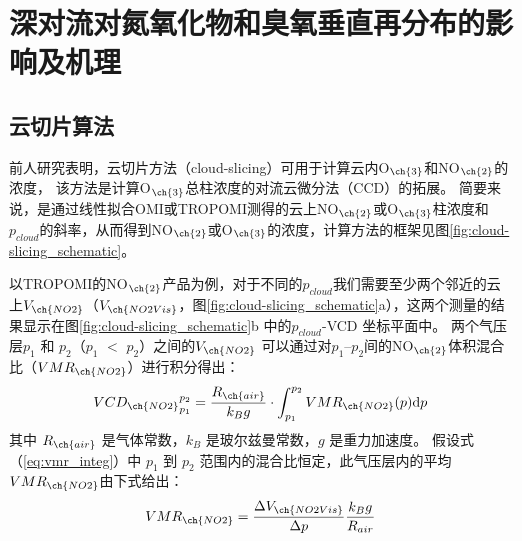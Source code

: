 
\chapter{深对流对氮氧化物和臭氧垂直再分布的影响及机理}

\section{云切片算法} \label{sec:cloud-slicing}

前人研究表明，云切片方法（cloud-slicing）可用于计算云内O$_{\ch{3}}$和NO$_{\ch{2}}$的浓度，
该方法是计算O$_{\ch{3}}$总柱浓度的对流云微分法（CCD）的拓展\citep{Ziemke.1998,Ziemke.2001}。
简要来说，是通过线性拟合OMI或TROPOMI测得的云上NO$_{\ch{2}}$或O$_{\ch{3}}$柱浓度和$p_{cloud}$的斜率，从而得到NO$_{\ch{2}}$或O$_{\ch{3}}$的浓度，计算方法的框架见图\ref{fig:cloud-slicing_schematic}。

以TROPOMI的NO$_{\ch{2}}$产品为例，对于不同的$p_{cloud}$我们需要至少两个邻近的云上$V_{\ch{NO2}}$（$V_{\ch{NO2Vis}}$，图\ref{fig:cloud-slicing_schematic}a），这两个测量的结果显示在图\ref{fig:cloud-slicing_schematic}b 中的$p_{cloud}$-VCD 坐标平面中。
两个气压层$p_1$ 和 $p_2$（$p_1$ $<$ $p_2$）之间的$V_{\ch{NO2}}$
可以通过对$p_1$--$p_2$间的NO$_{\ch{2}}$体积混合比（$VMR_{\ch{NO2}}$）进行积分得出：
\begin{equation} \label{eq:vmr_integ}
{VCD_{\ch{NO2}}}_{p_1}^{p_2}=\frac{R_{\ch{air}}}{k_Bg} \cdot \int_{p_1}^{p_2} VMR_{\ch{NO2}}(p) \mathrm{d} p
\end{equation}
其中 $R_{\ch{air}}$ 是气体常数，$k_B$ 是玻尔兹曼常数，$g$ 是重力加速度。
假设式（\ref{eq:vmr_integ}）中 $p_1$ 到 $p_2$ 范围内的混合比恒定，此气压层内的平均$VMR_{\ch{NO2}}$由下式给出：
\begin{equation}
VMR_{\ch{NO2}} = \frac{\Delta V_{\ch{NO2Vis}}}{\Delta p} \frac{k_B g}{R_{air}}
\end{equation}

